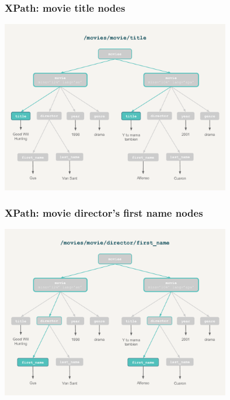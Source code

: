 \documentclass{beamer}\usepackage[]{graphicx}\usepackage[]{color}
\begin{document}
\begin{frame}[fragile]
\frametitle{XPath: movie title nodes}

\begin{center}
\includegraphics[width=10cm]{images/xpath_title.pdf}
\end{center}

\end{frame}


\begin{frame}[fragile]
\frametitle{XPath: movie director's first name nodes}

\begin{center}
\includegraphics[width=10cm]{images/xpath_firstname.pdf}
\end{center}

\end{frame}

\end{document}
